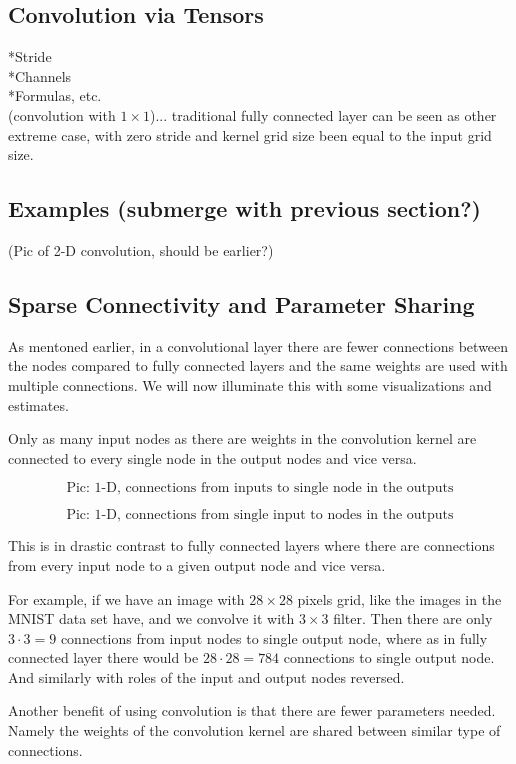 \documentclass[]{article}
\begin{document}
\subsection{Convolution via Tensors}
*Stride\\
*Channels\\
*Formulas, etc.\\
(convolution with $1\times 1$)... traditional fully connected layer can be seen
as other extreme case, with zero stride and kernel grid size been equal to the
input grid size.

\subsection{Examples (submerge with previous section?)}
(Pic of 2-D convolution, should be earlier?)

\subsection{Sparse Connectivity and Parameter Sharing}
As mentoned earlier, in a convolutional layer there are fewer connections
between the nodes compared to fully connected layers and the same weights are used
with multiple connections. We will now illuminate this with some visualizations
and estimates.

Only as many input nodes as there are weights in the convolution kernel are
connected to every single node in the output nodes and vice versa.

\[
\text{Pic: 1-D, connections from inputs to single node in the outputs}
\]

\[
\text{Pic: 1-D, connections from single input to nodes in the outputs}
\]

This is in drastic contrast to fully connected layers where there are connections
from every input node to a given output node and vice versa.

For example, if we have an image with $28 \times 28$ pixels grid, like the images
in the MNIST data set have, and we convolve it with $3 \times 3$ filter. Then
there are only $3 \cdot 3 = 9$ connections from input nodes to single output node,
where as in fully connected layer there would be $28 \cdot 28 = 784$ connections
to single output node. And similarly with roles of the input and output nodes reversed.

Another benefit of using convolution is that there are fewer parameters needed.
Namely the weights of the convolution kernel are shared between similar type of
connections.
\end{document}
